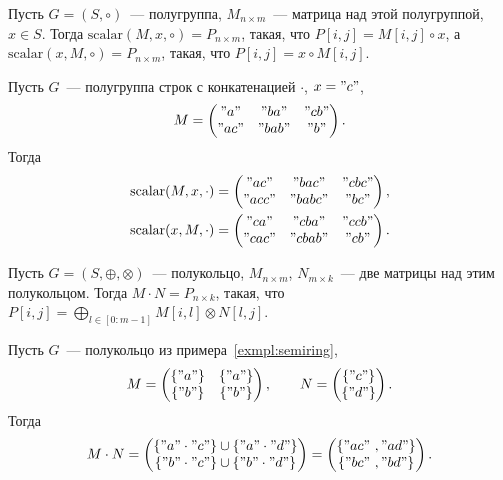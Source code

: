 \begin{definition}
    Пусть $G = (S, \circ)$~--- полугруппа, $M_{n \times m}$~--- матрица над этой полугруппой, $x \in S$.
    Тогда $\mathrm{scalar}(M, x,\circ) = P_{n \times m}$, такая, что $P[i, j] = M[i, j] \circ x$, а $\mathrm{scalar}(x, M, \circ) = P_{n \times m}$, такая, что $P[i, j] = x \circ M[i, j]$.
\end{definition}

\begin{example}
    Пусть $G$~--- полугруппа строк с конкатенацией $\cdot$, $x = "c"$,
    \[
        M =
        \begin{pmatrix}
            "a"  & "ba"  & "cb" \\
            "ac" & "bab" & "b"
        \end{pmatrix}.
    \]
    Тогда
    \begin{gather*}
        \mathrm{scalar}(M,x, \cdot) =
        \begin{pmatrix}
            "ac"  & "bac"  & "cbc" \\
            "acc" & "babc" & "bc"
        \end{pmatrix},\\
        \mathrm{scalar}(x, M, \cdot) =
        \begin{pmatrix}
            "ca"  & "cba"  & "ccb" \\
            "cac" & "cbab" & "cb"
        \end{pmatrix}.
    \end{gather*}
\end{example}

\begin{definition}
    \label{def:MxM}
    Пусть $G = (S, \oplus, \otimes)$~--- полукольцо, $M_{n \times m}$, $N_{m\times k}$~--- две матрицы над этим полукольцом.
    Тогда $M \cdot N = P_{n \times k}$, такая, что $P[i, j] = \bigoplus_{l \in [0 : m - 1]} M[i, l] \otimes N[l, j]$.
\end{definition}

\begin{example}
    Пусть $G$~--- полукольцо из примера~\ref{exmpl:semiring},
    \[
        M =
        \begin{pmatrix}
            \{"a"\} & \{"a"\} \\
            \{"b"\} & \{"b"\}
        \end{pmatrix},
        \qquad
        N =
        \begin{pmatrix}
            \{"c"\} \\
            \{"d"\}
        \end{pmatrix}.
    \]
    Тогда
    \[
        M \cdot N =
        \begin{pmatrix}
            \{"a" \cdot "c"\} \cup \{"a" \cdot "d"\} \\
            \{"b" \cdot "c"\} \cup \{"b" \cdot "d"\}
        \end{pmatrix}=
        \begin{pmatrix}
            \{"ac" \ ,  "ad"\} \\
            \{"bc" \ , "bd"\}
        \end{pmatrix}.
    \]
\end{example}

